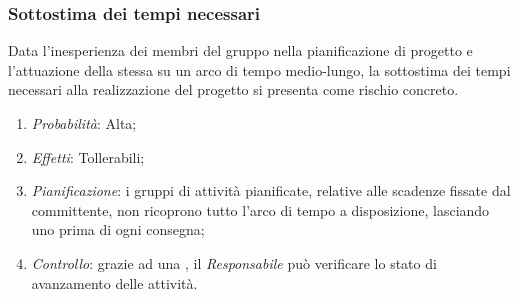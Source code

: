 \subsubsection{Sottostima dei tempi necessari}
Data l'inesperienza dei membri del gruppo nella pianificazione di progetto e l'attuazione della stessa su un arco di tempo medio-lungo, la sottostima dei tempi necessari alla realizzazione del progetto si presenta come rischio concreto.
\begin{enumerate}
\item \textit{Probabilit\`a}: Alta;
\item \textit{Effetti}: Tollerabili;
\item \textit{Pianificazione}: i gruppi di attivit\`a pianificate, relative alle scadenze fissate dal committente, non ricoprono tutto l'arco di tempo a disposizione, lasciando uno  prima di ogni consegna;
\item \textit{Controllo}: grazie ad una , il \textit{Responsabile} pu\`o verificare lo stato di avanzamento delle attivit\`a.
\end{enumerate}

